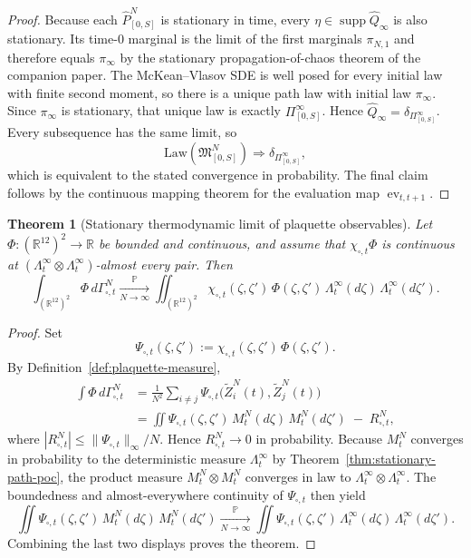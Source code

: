 \documentclass[11pt]{article}
\newtheorem{theorem}{Theorem}[section]
\theoremstyle{remark}
\newcommand{\R}{\mathbb R}
\begin{document}
\begin{proof}
Because each $\widehat P_{[0,S]}^N$ is stationary in time, every
$\eta\in\operatorname{supp}\widehat Q_\infty$ is also stationary.
Its time-$0$ marginal is the limit of the first marginals $\pi_{N,1}$ and
therefore equals $\pi_\infty$ by the stationary propagation-of-chaos theorem of
the companion paper.
The McKean--Vlasov SDE is well posed for every initial law with finite second
moment, so there is a unique path law with initial law $\pi_\infty$.
Since $\pi_\infty$ is stationary, that unique law is exactly
$\Pi_{[0,S]}^\infty$.
Hence $\widehat Q_\infty=\delta_{\Pi_{[0,S]}^\infty}$.
Every subsequence has the same limit, so
\[
\mathrm{Law}(\mathfrak M_{[0,S]}^N)\Rightarrow \delta_{\Pi_{[0,S]}^\infty},
\]
which is equivalent to the stated convergence in probability.
The final claim follows by the continuous mapping theorem for the evaluation map
$\operatorname{ev}_{t,t+1}$.
\end{proof}

\begin{theorem}[Stationary thermodynamic limit of plaquette observables]
\label{thm:plaquette-measure-limit}
Let $\Phi:(\R^{12})^2\to\R$ be bounded and continuous, and assume that
$\chi_{\square,t}\Phi$ is continuous at
$(\Lambda_t^\infty\otimes\Lambda_t^\infty)$-almost every pair.
Then
\[
\int_{(\R^{12})^2}\Phi\,d\Gamma_{\square,t}^N
\xrightarrow[N\to\infty]{\mathbb P}
\iint_{(\R^{12})^2}
\chi_{\square,t}(\zeta,\zeta')\,\Phi(\zeta,\zeta')\,
\Lambda_t^\infty(d\zeta)\,\Lambda_t^\infty(d\zeta').
\]
\end{theorem}
\begin{proof}
Set
\[
\Psi_{\square,t}(\zeta,\zeta'):=\chi_{\square,t}(\zeta,\zeta')\,\Phi(\zeta,\zeta').
\]
By Definition~\ref{def:plaquette-measure},
\begin{align*}
\int \Phi\,d\Gamma_{\square,t}^N
&=
\frac1{N^2}\sum_{i\ne j}
\Psi_{\square,t}\bigl(\widetilde Z_i^N(t),\widetilde Z_j^N(t)\bigr)\\
&=
\iint \Psi_{\square,t}(\zeta,\zeta')\,M_t^N(d\zeta)\,M_t^N(d\zeta')
\;-\;R_{\square,t}^N,
\end{align*}
where $|R_{\square,t}^N|\le \|\Psi_{\square,t}\|_\infty/N$.
Hence $R_{\square,t}^N\to0$ in probability.
Because $M_t^N$ converges in probability to the deterministic measure
$\Lambda_t^\infty$ by Theorem~\ref{thm:stationary-path-poc},
the product measure $M_t^N\otimes M_t^N$ converges in law to
$\Lambda_t^\infty\otimes\Lambda_t^\infty$.
The boundedness and almost-everywhere continuity of $\Psi_{\square,t}$ then yield
\[
\iint \Psi_{\square,t}(\zeta,\zeta')\,M_t^N(d\zeta)\,M_t^N(d\zeta')
\xrightarrow[N\to\infty]{\mathbb P}
\iint \Psi_{\square,t}(\zeta,\zeta')\,
\Lambda_t^\infty(d\zeta)\,\Lambda_t^\infty(d\zeta').
\]
Combining the last two displays proves the theorem.
\end{proof}
\end{document}
